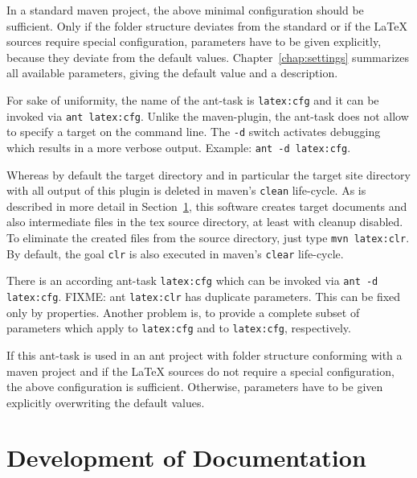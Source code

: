 \documentclass[12pt]{book}
\begin{document}
In a standard maven project, 
the above minimal configuration should be sufficient. 
Only if the folder structure deviates from the standard 
or if the \LaTeX{} sources require special configuration, 
parameters have to be given explicitly, 
because they deviate from the default values. 
Chapter~\ref{chap:settings} summarizes all available parameters, 
giving the default value and a description. 


For sake of uniformity, 
the name of the ant-task is \texttt{latex:cfg} 
and it can be invoked via \texttt{ant latex:cfg}. 
Unlike the maven-plugin, the ant-task 
does not allow to specify a target on the command line. 
The \texttt{-d} switch activates debugging 
which results in a more verbose output. 
Example: \texttt{ant -d latex:cfg}. 

Whereas by default the target directory and in particular 
the target site directory with all output of this plugin is deleted 
in maven's \texttt{clean} life-cycle. 
As is described in more detail in Section~\ref{sec:devel}, 
this software creates target documents and also intermediate files 
in the tex source directory, at least with cleanup disabled. 
To eliminate the created files from the source directory, 
just type \texttt{mvn latex:clr}. 
By default, the goal \texttt{clr} 
is also executed in maven's \texttt{clear} life-cycle. 

There is an according ant-task \texttt{latex:cfg} 
which can be invoked via \texttt{ant -d latex:cfg}. 
FIXME\@: ant  \texttt{latex:clr} has duplicate parameters. 
This can be fixed only by properties. 
Another problem is, to provide a complete subset of parameters 
which apply to \texttt{latex:cfg} and to \texttt{latex:cfg}, respectively. 

If this ant-task is used in an ant project 
with folder structure conforming with a maven project 
and if the \LaTeX{} sources do not require a special configuration, 
the above configuration is sufficient. 
Otherwise, parameters have to be given explicitly 
overwriting the default values. 

\section{Development of Documentation}\label{sec:devel}
\end{document}
